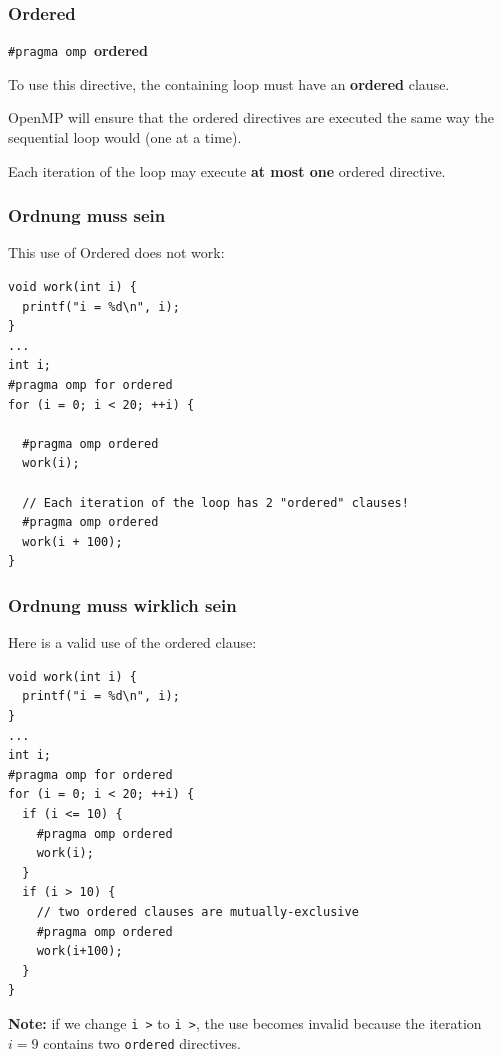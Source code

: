\begin{frame}
\frametitle{Ordered}

 \begin{center}
    {\tt \#pragma omp }{\bf ordered}
  \end{center}

    To use this directive, the containing loop must have an {\bf ordered} clause.
   
   
    OpenMP will ensure that the ordered directives are executed the same
      way the sequential loop would (one at a time).
  
  
    Each iteration of the loop may execute {\bf at most one} ordered
      directive.

\end{frame}


\begin{frame}[fragile]
\frametitle{Ordnung muss sein}

This use of Ordered does not work:

  \begin{lstlisting}
void work(int i) {
  printf("i = %d\n", i);
}
...
int i;
#pragma omp for ordered
for (i = 0; i < 20; ++i) {

  #pragma omp ordered
  work(i);

  // Each iteration of the loop has 2 "ordered" clauses!
  #pragma omp ordered 
  work(i + 100);
}
\end{lstlisting}


\end{frame}


\begin{frame}[fragile]
\frametitle{Ordnung muss wirklich sein}

Here is a valid use of the ordered clause:
 \begin{lstlisting}
void work(int i) {
  printf("i = %d\n", i);
}
...
int i;
#pragma omp for ordered
for (i = 0; i < 20; ++i) {
  if (i <= 10) {
    #pragma omp ordered
    work(i);
  }
  if (i > 10) {
    // two ordered clauses are mutually-exclusive
    #pragma omp ordered
    work(i+100);
  }
}
  \end{lstlisting}

{\bf Note:} if we change {\tt i \textgreater{}} to {\tt i \textgreater{}}, 
the use becomes invalid because the iteration $i=9$ contains two {\tt ordered}
directives.

\end{frame}


